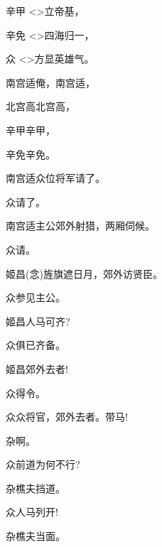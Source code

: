 {辛甲\hspace{30pt} \textless{}\!\textgreater{}立帝基，

辛免\hspace{30pt} \textless{}\!\textgreater{}四海归一，

众\hspace{41pt} \textless{}\!\textgreater{}方显英雄气。

南宫适\hspace{20pt}俺，南宫适，

北宫高\hspace{20pt}北宫高，

辛甲\hspace{30pt}辛甲，

辛免\hspace{30pt}辛免。

南宫适\hspace{20pt}众位将军请了。

众\hspace{41pt}请了。

南宫适\hspace{20pt}主公郊外射猎，两厢伺候。

众\hspace{41pt}请。

姬昌\hspace{30pt}({\akai 念})旌旗遮日月，郊外访贤臣。

众\hspace{41pt}参见主公。

姬昌\hspace{30pt}人马可齐?

众\hspace{41pt}俱已齐备。

姬昌\hspace{30pt}郊外去者!

众\hspace{41pt}得令。

众\hspace{41pt}众将官，郊外去者。带马!

杂\hspace{41pt}啊。

众\hspace{41pt}前道为何不行?

杂\hspace{41pt}樵夫挡道。

众\hspace{41pt}人马列开!

杂\hspace{41pt}樵夫当面。

}
